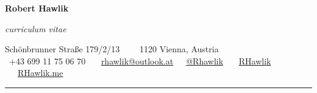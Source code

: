 \documentclass[11pt, a4paper]{article}
\begin{document}
\begin{center}
{\LARGE \textbf{Robert Hawlik}}

\emph{curriculum vitae}
\vspace{6pt}

Schönbrunner Straße 179/2/13\ \ \textbullet
\ \ 1120 Vienna, Austria
\\
\faMobile \ +43 699 11 75 06 70 \ \ \faPaperPlane \ \href{mailto:rhawlik@outlook.at}{rhawlik@outlook.at}\ \ \faTwitter \ \href{https://twitter.com/RHawlik}{@Rhawlik} \ \ \faLinkedin \ \href{https://www.linkedin.com/in/rhawlik}{RHawlik}
\ \ \faGlobe \ \href{https://rhawlik.me}{RHawlik.me}
\vspace{-5pt}
\end{center}

\hrule
\vspace{0em}

%
\end{document}
